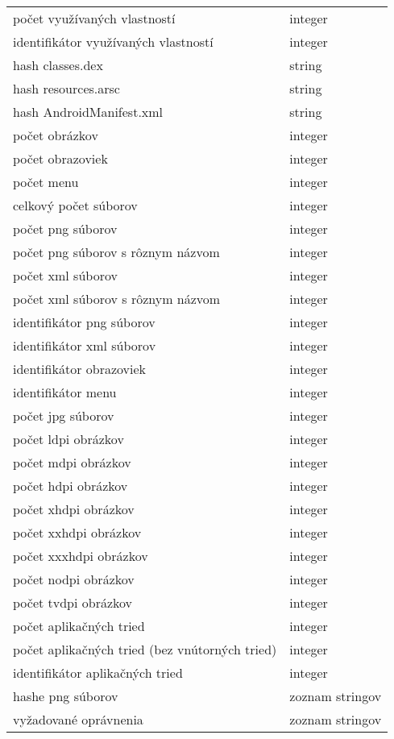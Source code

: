 \begin{longtable}{|l|p{3.3cm}|}
počet využívaných vlastností								& integer \\
identifikátor využívaných vlastností								& integer \\
hash classes.dex						& string \\
hash resources.arsc						& string \\
hash AndroidManifest.xml				& string \\
počet obrázkov							& integer \\
počet obrazoviek							& integer \\				
počet menu							& integer \\
celkový počet súborov							& integer \\
počet png súborov							& integer \\
počet png súborov s rôznym názvom							& integer \\
počet xml súborov							& integer \\
počet xml súborov s rôznym názvom							& integer \\
identifikátor png súborov 					& integer \\
identifikátor xml súborov 					& integer \\
identifikátor obrazoviek 					& integer \\
identifikátor menu 					& integer \\
počet jpg súborov 					& integer \\
počet ldpi obrázkov					& integer \\
počet mdpi obrázkov 					& integer \\
počet hdpi obrázkov 					& integer \\
počet xhdpi obrázkov 					& integer \\
počet xxhdpi obrázkov 					& integer \\
počet xxxhdpi obrázkov 					& integer \\
počet nodpi obrázkov 					& integer \\
počet tvdpi obrázkov 					& integer \\
počet aplikačných tried					& integer \\
počet aplikačných tried	(bez vnútorných tried)				& integer \\
identifikátor aplikačných tried					& integer \\
hashe png súborov					& zoznam stringov \\
vyžadované oprávnenia					& zoznam stringov 
  \label{tab:zbieraneData}
\end{longtable}